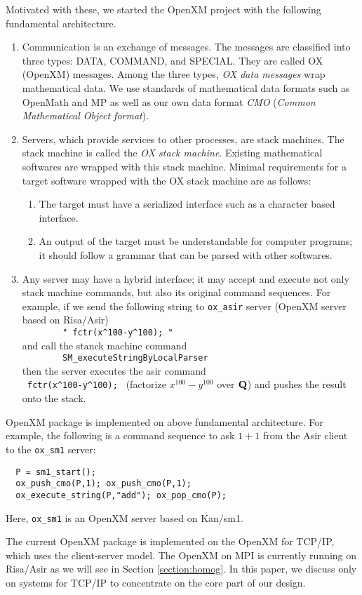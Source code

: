 Motivated with these, we started the OpenXM project with the following
fundamental architecture.
\begin{enumerate}
\item Communication is an exchange of messages. The messages are classified into
three types:
DATA, COMMAND, and SPECIAL.
They are called OX (OpenXM) messages.
Among the three types,
{\it OX data messages} wrap mathematical data.
We use standards of mathematical data formats such as OpenMath and MP
as well as our own data format {\it CMO}
({\it Common Mathematical Object format}).
\item Servers, which provide services to other processes, are stack machines.
The stack machine is called the
{\it OX stack machine}.
Existing mathematical softwares are wrapped with this stack machine.
Minimal requirements for a target software wrapped with the OX stack machine
are as follows:
\begin{enumerate}
\item The target must have a serialized interface such as a character based
interface.
\item An output of the target must be understandable for computer programs;
it should follow a grammar that can be parsed with other softwares.
\end{enumerate}
\item Any server may have a hybrid interface;
it may accept and execute not only stack machine commands, 
but also its original command sequences.
For example,
if we send the following string to {\tt ox\_asir} server 
(OpenXM server based on Risa/Asir) \\
\verb+        " fctr(x^100-y^100); "      + \\
and call the stanck machine command  \\
\verb+        SM_executeStringByLocalParser    + \\ 
then the server executes the asir command \\
\verb+ fctr(x^100-y^100); + 
(factorize $x^{100}-y^{100}$ over ${\bf Q}$)
and pushes the result onto the stack.
\end{enumerate}
OpenXM package  is implemented on above fundamental architecture.
For example, the following is a command sequence to ask $1+1$ from
the Asir client to the {\tt ox\_sm1} server:
\begin{verbatim}
  P = sm1_start();
  ox_push_cmo(P,1); ox_push_cmo(P,1);
  ox_execute_string(P,"add"); ox_pop_cmo(P);
\end{verbatim}
Here, {\tt ox\_sm1} is an OpenXM server based on Kan/sm1.

The current OpenXM package is implemented on the  OpenXM for TCP/IP, 
which uses the client-server model.
The OpenXM on MPI \cite{MPI} is currently running on Risa/Asir
as we will see in Section \ref{section:homog}.
In this paper, we discuss only on systems for TCP/IP
to concentrate on the core part of our design.






